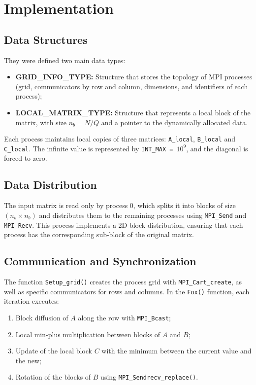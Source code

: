 \documentclass[10pt,a4paper]{article}
\begin{document}
\section{Implementation}
\subsection{Data Structures}
They were defined two main data types:
\begin{itemize}
  \item \textbf{GRID\_INFO\_TYPE:} Structure that stores the topology of MPI processes (grid, communicators by row and column, dimensions, and identifiers of each process);
  \item \textbf{LOCAL\_MATRIX\_TYPE:} Structure that represents a local block of the matrix, with size \(n_b = N/Q\) and a pointer to the dynamically allocated data.
\end{itemize}

Each process maintains local copies of three matrices: \texttt{A\_local}, \texttt{B\_local} and \texttt{C\_local}. The infinite value is represented by \texttt{INT\_MAX = $10^9$}, and the diagonal is forced to zero.

\subsection{Data Distribution}
The input matrix is read only by process 0, which splits it into blocks of size \((n_b \times n_b)\) and distributes them to the remaining processes using \texttt{MPI\_Send} and \texttt{MPI\_Recv}. This process implements a 2D block distribution, ensuring that each process has the corresponding sub-block of the original matrix.

\subsection{Communication and Synchronization}
The function \texttt{Setup\_grid()} creates the process grid with \texttt{MPI\_Cart\_create}, as well as specific communicators for rows and columns. In the \texttt{Fox()} function, each iteration executes:
\begin{enumerate}
  \item Block diffusion of \(A\) along the row with \texttt{MPI\_Bcast};
  \item Local min-plus multiplication between blocks of \(A\) and \(B\);
  \item Update of the local block \(C\) with the minimum between the current value and the new;
  \item Rotation of the blocks of \(B\) using \texttt{MPI\_Sendrecv\_replace()}.
\end{enumerate}
\end{document}
